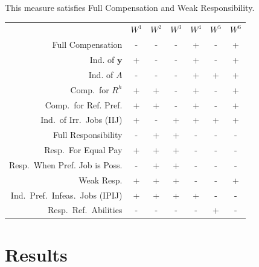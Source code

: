 \documentclass[12pt,thmsb]{article}
\begin{document}
This measure satisfies Full Compensation and Weak Responsibility.\\

\begin{tabular}{r|c|c|c|c|c|c|}
     & $W^1$ & $W^2$ & $W^3$ & $W^4$ & $W^5$ & $W^6$ \\
Full Compensation     & - & - & - & + & - & + \\
Ind. of $\mathbf{y}$     & + & - & - & + & - & + \\
Ind. of $A$     & - & - & - & + & + & + \\
Comp.\ for $R^{h}$     & + & + & - & + & - & + \\
Comp.\ for Ref. Pref.     & + & + & - & + & - & + \\
Ind.\ of Irr.\ Jobs (IIJ)     & + & - & + & + & + & + \\
Full Responsibility     & - & + & + & - & - & - \\
Resp.\ For Equal Pay     & + & + & + & - & - & - \\
Resp.\ When Pref. Job is Poss.     & - & + & + & - & - & - \\
Weak Resp.     & + & + & + & - & - & + \\
Ind.\ Pref.\ Infeas.\ Jobs (IPIJ)    & + & + & + & + & - & - \\
Resp.\ Ref.\ Abilities   & - & - & - & - & + & - \\
\end{tabular}

%
%

\section{Results}
\end{document}
